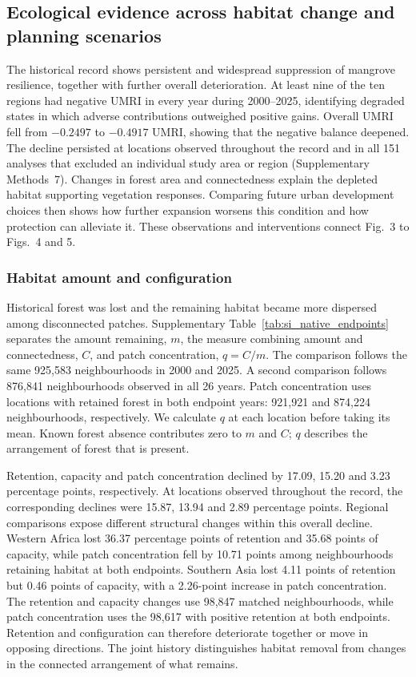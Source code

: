 \subsection{Ecological evidence across habitat change and planning scenarios}

The historical record shows persistent and widespread suppression of mangrove resilience, together with further overall deterioration. At least nine of the ten regions had negative UMRI in every year during 2000--2025, identifying degraded states in which adverse contributions outweighed positive gains. Overall UMRI fell from $-0.2497$ to $-0.4917$ UMRI, showing that the negative balance deepened. The decline persisted at locations observed throughout the record and in all 151 analyses that excluded an individual study area or region (Supplementary Methods~7). Changes in forest area and connectedness explain the depleted habitat supporting vegetation responses. Comparing future urban development choices then shows how further expansion worsens this condition and how protection can alleviate it. These observations and interventions connect Fig.~3 to Figs.~4 and 5.

\subsubsection{Habitat amount and configuration}

Historical forest was lost and the remaining habitat became more dispersed among disconnected patches. Supplementary Table~\ref{tab:si_native_endpoints} separates the amount remaining, $m$, the measure combining amount and connectedness, $C$, and patch concentration, $q=C/m$. The comparison follows the same 925,583 neighbourhoods in 2000 and 2025. A second comparison follows 876,841 neighbourhoods observed in all 26 years. Patch concentration uses locations with retained forest in both endpoint years: 921,921 and 874,224 neighbourhoods, respectively. We calculate $q$ at each location before taking its mean. Known forest absence contributes zero to $m$ and $C$; $q$ describes the arrangement of forest that is present.

Retention, capacity and patch concentration declined by 17.09, 15.20 and 3.23 percentage points, respectively. At locations observed throughout the record, the corresponding declines were 15.87, 13.94 and 2.89 percentage points. Regional comparisons expose different structural changes within this overall decline. Western Africa lost 36.37 percentage points of retention and 35.68 points of capacity, while patch concentration fell by 10.71 points among neighbourhoods retaining habitat at both endpoints. Southern Asia lost 4.11 points of retention but 0.46 points of capacity, with a 2.26-point increase in patch concentration. The retention and capacity changes use 98,847 matched neighbourhoods, while patch concentration uses the 98,617 with positive retention at both endpoints. Retention and configuration can therefore deteriorate together or move in opposing directions. The joint history distinguishes habitat removal from changes in the connected arrangement of what remains.

